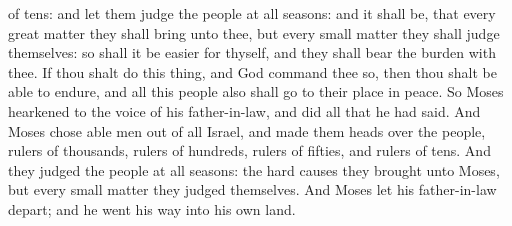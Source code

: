 of tens: and let them judge the people at all seasons: and it shall be, that every great matter they shall bring unto thee, but every small matter they shall judge themselves: so shall it be easier for thyself, and they shall bear the burden with thee. If thou shalt do this thing, and God command thee so, then thou shalt be able to endure, and all this people also shall go to their place in peace. So Moses hearkened to the voice of his father-in-law, and did all that he had said. And Moses chose able men out of all Israel, and made them heads over the people, rulers of thousands, rulers of hundreds, rulers of fifties, and rulers of tens. And they judged the people at all seasons: the hard causes they brought unto Moses, but every small matter they judged themselves. And Moses let his father-in-law depart; and he went his way into his own land. 


